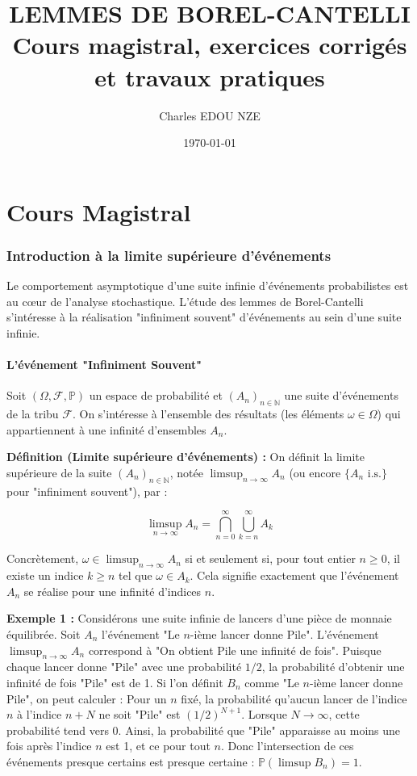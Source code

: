 \documentclass[11pt,a4paper]{article}
\title{\Huge LEMMES DE BOREL-CANTELLI \\ \large Cours magistral, exercices corrigés et travaux pratiques}
\author{\Large Charles EDOU NZE}
\date{\today}
\begin{document}
\maketitle
\tableofcontents
\newpage

\part{Cours Magistral}


\section{Introduction à la limite supérieure d'événements}

Le comportement asymptotique d'une suite infinie d'événements probabilistes est au cœur de l'analyse stochastique. L'étude des lemmes de Borel-Cantelli s'intéresse à la réalisation "infiniment souvent" d'événements au sein d'une suite infinie.

\subsection{L'événement "Infiniment Souvent"}

Soit $(\Omega, \mathcal{F}, \mathbb{P})$ un espace de probabilité et $(A_n)_{n \in \mathbb{N}}$ une suite d'événements de la tribu $\mathcal{F}$. On s'intéresse à l'ensemble des résultats (les éléments $\omega \in \Omega$) qui appartiennent à une infinité d'ensembles $A_n$.

\textbf{Définition (Limite supérieure d'événements) :}
On définit la limite supérieure de la suite $(A_n)_{n \in \mathbb{N}}$, notée $\limsup_{n \to \infty} A_n$ (ou encore $\{A_n \text{ i.s.}\}$ pour "infiniment souvent"), par :

$$ \limsup_{n \to \infty} A_n = \bigcap_{n=0}^\infty \bigcup_{k=n}^\infty A_k $$

Concrètement, $\omega \in \limsup_{n \to \infty} A_n$ si et seulement si, pour tout entier $n \ge 0$, il existe un indice $k \ge n$ tel que $\omega \in A_k$. Cela signifie exactement que l'événement $A_n$ se réalise pour une infinité d'indices $n$.

\textbf{Exemple 1 :}
Considérons une suite infinie de lancers d'une pièce de monnaie équilibrée. Soit $A_n$ l'événement "Le $n$-ième lancer donne Pile". L'événement $\limsup_{n \to \infty} A_n$ correspond à "On obtient Pile une infinité de fois". Puisque chaque lancer donne "Pile" avec une probabilité $1/2$, la probabilité d'obtenir une infinité de fois "Pile" est de 1.
Si l'on définit $B_n$ comme "Le $n$-ième lancer donne Pile", on peut calculer :
Pour un $n$ fixé, la probabilité qu'aucun lancer de l'indice $n$ à l'indice $n+N$ ne soit "Pile" est $(1/2)^{N+1}$.
Lorsque $N \to \infty$, cette probabilité tend vers 0. Ainsi, la probabilité que "Pile" apparaisse au moins une fois après l'indice $n$ est 1, et ce pour tout $n$. Donc l'intersection de ces événements presque certains est presque certaine : $\mathbb{P}(\limsup B_n) = 1$.
\end{document}
